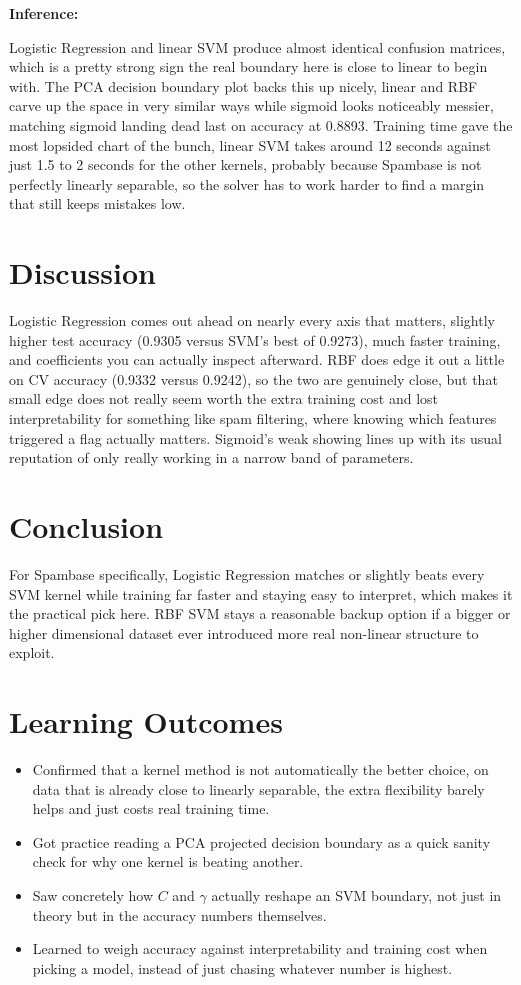 \documentclass[12pt,a4paper]{article}
\begin{document}
\textbf{Inference:}

Logistic Regression and linear SVM produce almost identical confusion matrices, which is a pretty
strong sign the real boundary here is close to linear to begin with. The PCA decision boundary plot
backs this up nicely, linear and RBF carve up the space in very similar ways while sigmoid looks
noticeably messier, matching sigmoid landing dead last on accuracy at 0.8893. Training time gave the
most lopsided chart of the bunch, linear SVM takes around 12 seconds against just 1.5 to 2 seconds for
the other kernels, probably because Spambase is not perfectly linearly separable, so the solver has to
work harder to find a margin that still keeps mistakes low.

\section{Discussion}
Logistic Regression comes out ahead on nearly every axis that matters, slightly higher test accuracy
(0.9305 versus SVM's best of 0.9273), much faster training, and coefficients you can actually inspect
afterward. RBF does edge it out a little on CV accuracy (0.9332 versus 0.9242), so the two are genuinely
close, but that small edge does not really seem worth the extra training cost and lost interpretability
for something like spam filtering, where knowing which features triggered a flag actually matters.
Sigmoid's weak showing lines up with its usual reputation of only really working in a narrow band of
parameters.

\section{Conclusion}
For Spambase specifically, Logistic Regression matches or slightly beats every SVM kernel while
training far faster and staying easy to interpret, which makes it the practical pick here. RBF SVM
stays a reasonable backup option if a bigger or higher dimensional dataset ever introduced more real
non-linear structure to exploit.

\section{Learning Outcomes}
\begin{itemize}
\item Confirmed that a kernel method is not automatically the better choice, on data that is already
close to linearly separable, the extra flexibility barely helps and just costs real training time.
\item Got practice reading a PCA projected decision boundary as a quick sanity check for why one kernel
is beating another.
\item Saw concretely how $C$ and $\gamma$ actually reshape an SVM boundary, not just in theory but in
the accuracy numbers themselves.
\item Learned to weigh accuracy against interpretability and training cost when picking a model,
instead of just chasing whatever number is highest.
\end{itemize}
\end{document}
